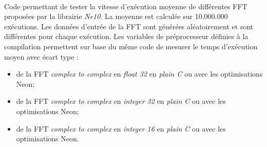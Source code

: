 \documentclass{article}
\begin{document}
\paragraph{}
Code permettant de tester la vitesse d'exécution moyenne de différentes FFT proposées par la librairie \emph{Ne10}. La moyenne est calculée sur 10.000.000 exécutions. Les données d'entrée de la FFT sont générées aléatoirement et sont différentes pour chaque exécution. Les variables de préprocesseur définies à la compilation permettent sur base du même code de mesurer le temps d'exécution moyen avec écart type :
\begin{itemize}
    \item de la FFT \emph{complex to complex} en \emph{float 32} en \emph{plain C} ou avec les optimisations Neon;
    \item de la FFT \emph{complex to complex} en \emph{integer 32} en \emph{plain C} ou avec les optimisations Neon;
    \item de la FFT \emph{complex to complex} en \emph{integer 16} en \emph{plain C} ou avec les optimisations Neon.
\end{itemize}
\lstset{language=C++}
\end{document}
